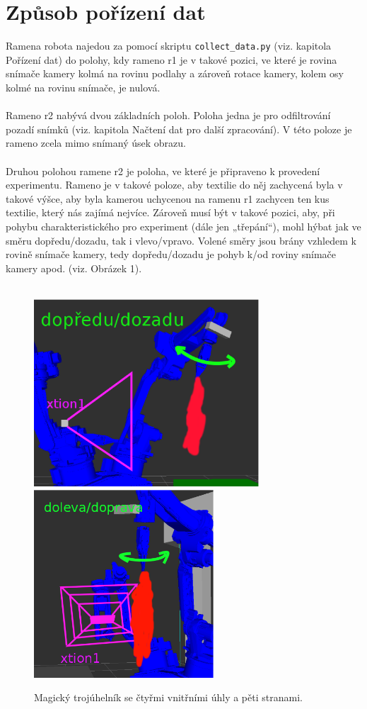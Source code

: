 \documentclass[10pt,a4paper,titlepage,oneside]{book}
\begin{document}
\section*{Způsob pořízení dat}
Ramena robota najedou za pomocí skriptu \verb|collect_data.py| (viz. kapitola Pořízení dat) do polohy, kdy rameno r1 je v takové pozici, ve které je rovina snímače kamery kolmá na rovinu podlahy a zároveň rotace kamery, kolem osy kolmé na rovinu snímače, je nulová.\\
\\
Rameno r2 nabývá dvou základních poloh. Poloha jedna je pro odfiltrování pozadí snímků (viz. kapitola Načtení dat pro další zpracování). V této poloze je rameno zcela mimo snímaný úsek obrazu.\\
\\ 
Druhou polohou ramene r2 je poloha, ve které je připraveno k provedení experimentu. Rameno je v takové poloze, aby textilie do něj zachycená byla v takové výšce, aby byla kamerou uchycenou na ramenu r1 zachycen ten kus textilie, který nás zajímá nejvíce. Zároveň musí být v takové pozici, aby, při pohybu charakteristického pro experiment (dále jen „třepání“), mohl hýbat jak ve směru dopředu/dozadu, tak i vlevo/vpravo. Volené směry jsou brány vzhledem k rovině snímače kamery, tedy dopředu/dozadu je pohyb k/od roviny snímače kamery apod. (viz. Obrázek 1).\\
\\
\begin{figure}[H]
	\centering  	
  	\includegraphics[height=7cm]{pictures/obrazek1.eps}
  	\includegraphics[height=7cm]{pictures/obrazek2.eps}
  	\caption{Magický trojúhelník se čtyřmi vnitřními úhly a pěti stranami.}
  	\label{fig:obrazek1}
\end{figure}
\end{document}
